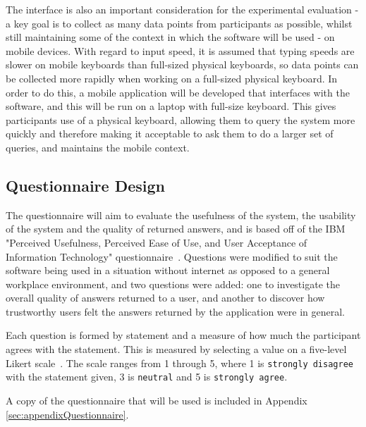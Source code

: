 \documentclass[authoryearcitations]{UoYCSproject}
\begin{document}
{\color{red} The interface is also an important consideration for the experimental evaluation - a key goal is to collect as many data points from participants as possible, whilst still maintaining some of the context in which the software will be used - on mobile devices. With regard to input speed, it is assumed that typing speeds are slower on mobile keyboards than full-sized physical keyboards, so data points can be collected more rapidly when working on a full-sized physical keyboard. In order to do this, a mobile application will be developed that interfaces with the software, and this will be run on a laptop with full-size keyboard. This gives participants use of a physical keyboard, allowing them to query the system more quickly and therefore making it acceptable to ask them to do a larger set of queries, and maintains the mobile context.}

\subsection{Questionnaire Design}
\label{subsec:questionnaire}
The questionnaire will aim to evaluate the usefulness of the system, the usability of the system and the quality of returned answers, and is based off of the IBM "Perceived Usefulness, Perceived Ease of Use, and User Acceptance of Information Technology" questionnaire~\cite{davis1989perceived}.  Questions were modified to suit the software being used in a situation without internet as opposed to a general workplace environment, and two questions were added: one to investigate the overall quality of answers returned to a user, and another to discover how trustworthy users felt the answers returned by the application were in general. 

Each question is formed by statement and a measure of how much the participant agrees with the statement. This is measured by selecting a value on a five-level Likert scale~\cite{likertScale}. The scale ranges from 1 through 5, where 1 is \texttt{strongly disagree} with the statement given, 3 is \texttt{neutral} and 5 is \texttt{strongly agree}.

A copy of the questionnaire that will be used is included in Appendix \ref{sec:appendixQuestionnaire}.
\end{document}
